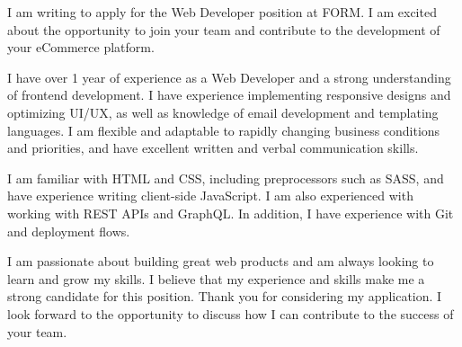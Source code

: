 \documentclass[11pt, a4paper]{awesome-cv}
\begin{document}
\makecvheader[R]


\makelettertitle

\begin{cvletter}

	I am writing to apply for the Web Developer position at FORM. I am excited about the opportunity to join your team and contribute to the development of your eCommerce platform.

	I have over 1 year of experience as a Web Developer and a strong understanding of frontend development. I have experience implementing responsive designs and optimizing UI/UX, as well as knowledge of email development and templating languages. I am flexible and adaptable to rapidly changing business conditions and priorities, and have excellent written and verbal communication skills.

	I am familiar with HTML and CSS, including preprocessors such as SASS, and have experience writing client-side JavaScript. I am also experienced with working with REST APIs and GraphQL. In addition, I have experience with Git and deployment flows.

	I am passionate about building great web products and am always looking to learn and grow my skills. I believe that my experience and skills make me a strong candidate for this position. Thank you for considering my application. I look forward to the opportunity to discuss how I can contribute to the success of your team.

\end{cvletter}


\makeletterclosing
\end{document}
